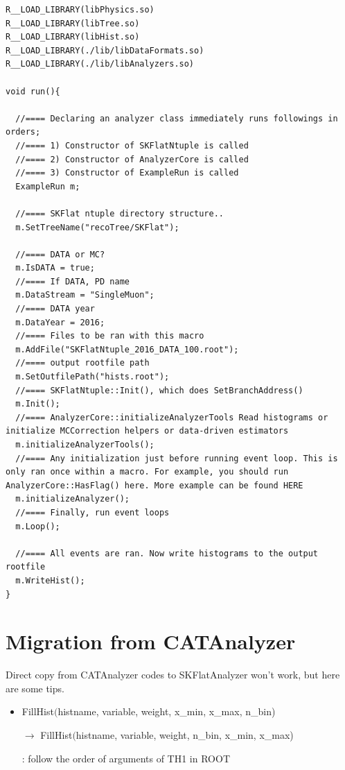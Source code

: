 \documentclass[12pt, a4paper, titlepage]{article}
\begin{document}
\begin{lstlisting}
R__LOAD_LIBRARY(libPhysics.so)
R__LOAD_LIBRARY(libTree.so)
R__LOAD_LIBRARY(libHist.so)
R__LOAD_LIBRARY(./lib/libDataFormats.so)
R__LOAD_LIBRARY(./lib/libAnalyzers.so)

void run(){

  //==== Declaring an analyzer class immediately runs followings in orders; 
  //==== 1) Constructor of SKFlatNtuple is called
  //==== 2) Constructor of AnalyzerCore is called
  //==== 3) Constructor of ExampleRun is called
  ExampleRun m;

  //==== SKFlat ntuple directory structure..
  m.SetTreeName("recoTree/SKFlat");

  //==== DATA or MC?
  m.IsDATA = true;
  //==== If DATA, PD name
  m.DataStream = "SingleMuon";
  //==== DATA year
  m.DataYear = 2016;
  //==== Files to be ran with this macro
  m.AddFile("SKFlatNtuple_2016_DATA_100.root");
  //==== output rootfile path
  m.SetOutfilePath("hists.root");
  //==== SKFlatNtuple::Init(), which does SetBranchAddress()
  m.Init(); 
  //==== AnalyzerCore::initializeAnalyzerTools Read histograms or initialize MCCorrection helpers or data-driven estimators
  m.initializeAnalyzerTools();
  //==== Any initialization just before running event loop. This is only ran once within a macro. For example, you should run AnalyzerCore::HasFlag() here. More example can be found HERE
  m.initializeAnalyzer();
  //==== Finally, run event loops
  m.Loop();

  //==== All events are ran. Now write histograms to the output rootfile
  m.WriteHist();
}

\end{lstlisting}

\clearpage

\section{Migration from CATAnalyzer}

Direct copy from CATAnalyzer codes to SKFlatAnalyzer won't work, but here are some tips.

\begin{itemize}

\item FillHist$($histname, variable, weight, x\_min, x\_max, n\_bin) \par
      $\rightarrow$ FillHist$($histname, variable, weight, n\_bin, x\_min, x\_max) \par
      : follow the order of arguments of TH1 in ROOT

\end{itemize}
\end{document}
